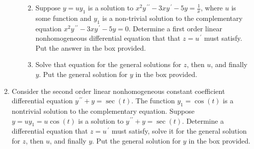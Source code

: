 \documentclass{ximera}
\begin{document}
\begin{enumerate}
\begin{enumerate}
\begin{enumerate}
\vfill

\item Suppose $y=uy_1$ is a solution to $x^2y^{\,\prime\prime}-3xy^{\,\prime}-5y=\displaystyle \frac{1}{x}$, where $u$ is some function and $y_1$ is a non-trivial solution to the complementary equation $x^2y^{\,\prime\prime}-3xy^{\,\prime}-5y=0$.  Determine a first order linear nonhomogeneous differential equation that that $z=u^{\,\prime}$ must satisfy.  Put the answer in the box provided.


\hfill{}\fbox{ \begin{minipage}{4in}\vspace{0.25in} \hfill\vspace{0.25in} \end{minipage} }

\vfill

\newpage

\item Solve that equation for the general solutions for $z$, then $u$, and finally $y$.  Put the general solution for $y$ in the box provided.

\hfill{}\fbox{ \begin{minipage}{4in}\vspace{0.25in} \hfill\vspace{0.25in} \end{minipage} }

\vfill

\end{enumerate}

\end{enumerate}

\item Consider the second order linear nonhomogeneous constant coefficient differential equation $y^{\,\prime\prime}+y=\sec{(t)}$.  The function $y_1=\cos{(t)}$ is a nontrivial solution to the complementary equation.  Suppose $y=uy_1=u\cos (t)$ is a solution to $y^{\,\prime\prime}+y=\sec{(t)}$.  Determine a differential equation that $z=u^{\,\prime}$ must satisfy, solve it for the general solution for $z$, then $u$, and finally $y$.  Put the general solution for $y$ in the box provided.

\hfill{}\fbox{ \begin{minipage}{4in}\vspace{0.25in} \hfill\vspace{0.25in} \end{minipage} }

\vfill



\end{enumerate}
\end{document}
